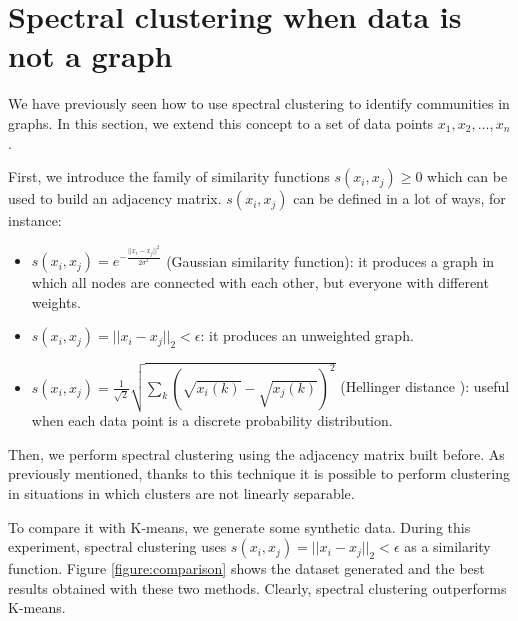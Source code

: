 \documentclass{article}
\begin{document}
\section{Spectral clustering when data is not a graph} \label{section:nograph}
We have previously seen how to use spectral clustering to identify communities in graphs.
In this section, we extend this concept to a set of data points $x_1, x_2, \dots, x_n$.

First, we introduce the family of similarity functions $s(x_i, x_j) \geq 0$ which can be used to build an adjacency matrix.
$s(x_i, x_j)$ can be defined in a lot of ways, for instance:
\begin{itemize}
    \item $s(x_i, x_j) = e^{ - \frac{||x_i - x_j||^2}{2\sigma^2}}$ (Gaussian similarity function): it produces a graph in which all nodes are connected with each other, but everyone with different weights.
    \item $s(x_i, x_j) = ||x_i - x_j||_2 < \epsilon$: it produces an unweighted graph.
    \item $s(x_i, x_j) = \frac{1}{\sqrt{2}} \sqrt{\sum_k (\sqrt{x_i(k)} - \sqrt{x_j(k)})^2}$ (Hellinger distance \cite{PPN243919689_0136}): useful when each data point is a discrete probability distribution.
\end{itemize}

Then, we perform spectral clustering using the adjacency matrix built before.
As previously mentioned, thanks to this technique it is possible to perform clustering in situations in which
clusters are not linearly separable.

To compare it with K-means, we generate some synthetic data.
During this experiment, spectral clustering uses $s(x_i, x_j) = ||x_i - x_j||_2 < \epsilon$ as a similarity function.
Figure \ref{figure:comparison} shows the dataset generated and the best results obtained with these two methods.
Clearly, spectral clustering outperforms K-means.
\end{document}
